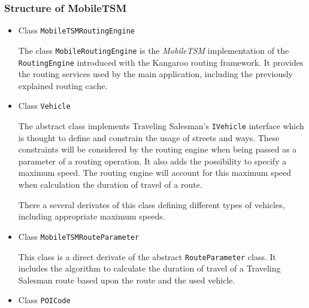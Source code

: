 \subsubsection{Structure of MobileTSM}

\begin{itemize}
		
	\item Class \texttt{MobileTSMRoutingEngine}
	
		The class \texttt{MobileRoutingEngine} is the \emph{MobileTSM} implementation of the \texttt{RoutingEngine} introduced with the Kangaroo routing framework. It provides the routing services used by the main application, including the previously explained routing cache.
		
	\item Class \texttt{Vehicle}
	
		The abstract class  implements Traveling Salesman's \texttt{IVehicle} interface which is thought to define and constrain the usage of streets and ways. These constraints will be considered by the routing engine when being passed as a parameter of a routing operation. It also adds the possibility to specify a maximum speed. The routing engine will account for this maximum speed when calculation the duration of travel of a route.\newline
		
		There a several derivates of this class defining different types of vehicles, including appropriate maximum speeds.
	
	\item Class \texttt{MobileTSMRouteParameter}
	
		This class is a direct derivate of the abstract \texttt{RouteParameter} class. It includes the algorithm to calculate the duration of travel of a Traveling Salesman route based upon the route and the used vehicle.

	\item Class \texttt{POICode}

\end{itemize}



